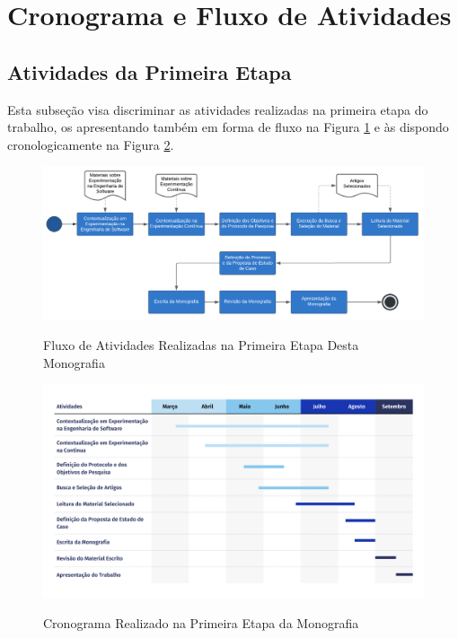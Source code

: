 \section{Cronograma e Fluxo de Atividades}\label{cronograma}

\subsection{Atividades da Primeira Etapa}
\label{cronograma1}


Esta subseção visa discriminar as atividades realizadas na primeira etapa do trabalho, os apresentando também em forma de fluxo na Figura \ref{fig:atividades_1} e às dispondo cronologicamente na Figura \ref{fig:cronograma_1}.

\begin{figure}[h!]
    \caption{Fluxo de Atividades Realizadas na Primeira Etapa Desta Monografia}
    \centering
    \includegraphics[width=.9\linewidth]{figuras/atividades1.png}
    \label{fig:atividades_1}
\end{figure}

\begin{figure}[h!]
    \caption{Cronograma Realizado na Primeira Etapa da Monografia}
    \centering
    \includegraphics[width=.9\linewidth]{figuras/cronograma1.png}
    \label{fig:cronograma_1}
\end{figure}


